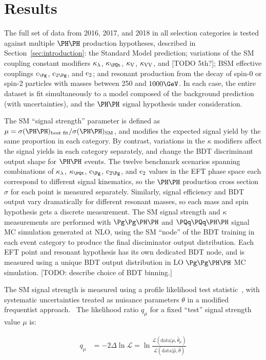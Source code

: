 \section{Results}
\label{sec:results}

The full set of data from 2016, 2017, and 2018 in all selection categories
is tested against multiple $\HH$ production hypotheses,
described in Section~\ref{sec:introduction}: the Standard Model prediction;
variations of the SM coupling constant modifiers
$\kappa_{\lambda}$, $\kappat$, $\kappa_{\textrm{V}}$, $\kappa_{\textrm{V}\textrm{V}}$, and [TODO 5th?];
BSM effective couplings $\cg$, $\cgg$, and $\text{c}_{2}$;
and resonant production from the decay of spin-0 or
spin-2 particles with masses between 250 and $1000\GeV$.
In each case, the entire dataset is fit simultaneously to a model
composed of the background prediction (with uncertainties),
and the $\HH$ signal hypothesis under consideration.

The SM ``signal strength'' parameter is defined as
$\mu = \sigma(\HH)_{\textrm{best fit}} / \sigma(\HH)_{\textrm{SM}}$,
and modifies the expected signal yield by the same proportion in each category.
By contrast, variations in the $\kappa$ modifiers affect the signal yields in each
category separately, and change the BDT discriminant output shape for $\HH$ events.
The twelve benchmark scenarios spanning combinations of $\kappa_{\lambda}$, $\kappat$,
$\cg$, $\cgg$, and $\text{c}_{2}$ values in the EFT phase space each correspond to
different signal kinematics, so the $\HH$ production cross section $\sigma$
for each point is measured separately.
Similarly, signal efficiency and BDT output vary dramatically for different
resonant masses, so each mass and spin hypothesis gets a discrete measurement.
The SM signal strength and $\kappa$ measurements are performed with $\ggHH$ and
$\qqHH$ signal MC simulation generated at NLO, using the SM ``node'' of the BDT
training in each event category to produce the final disciminator output distribution.
Each EFT point and resonant hypothesis has its own dedicated BDT node, and
is measured using a unique BDT output distribution in LO $\ggHH$ MC simulation.
[TODO: describe choice of BDT binning.]

The SM signal strength is measured using a profile likelihood test
statistic~\cite{Cowan:2010js}, with systematic uncertainties treated as nuisance
parameters $\theta$ in a modified frequentist approach.~\cite{ATL-PHYS-PUB-2011-011}
The likelihood ratio $q_{\mu}$ for a fixed ``test'' signal strength value $\mu$ is:

\begin{linenomath}
\begin{equation*}
  \begin{aligned}
    q_{\mu}  &  = -2 \Delta \ln \mathcal{L} = \ln \frac{\mathcal{L}(\mathrm{data}|\mu,\hat{\theta}_{\mu})}{\mathcal{L}(\mathrm{data}|\hat{\mu},\hat{\theta})}
  \end{aligned}
\end{equation*}
\end{linenomath}

